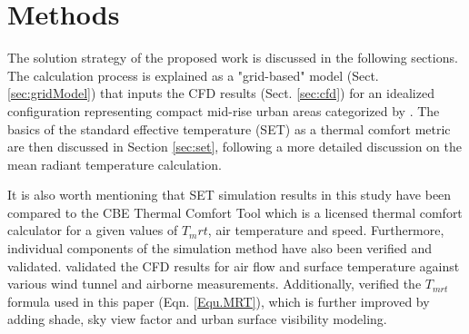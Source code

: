 \documentclass[smallextended]{svjour3}
\begin{document}
%
%
%
%
%
%
%
%
%
%
%
%
%
%
%
%
%   
%
%
%


\section{Methods}
The solution strategy of the proposed work is discussed in the following sections. The calculation process is explained as a "grid-based" model (Sect. \ref{sec:gridModel})  that inputs the CFD results (Sect. \ref{sec:cfd})  for an idealized configuration representing compact mid-rise urban areas categorized by \citet{stewart2012local}. The basics of the standard effective temperature (SET) as a thermal comfort metric are then discussed in Section \ref{sec:set}, following a more detailed discussion on the mean radiant temperature calculation. 

It is also worth mentioning that SET simulation results in this study have been compared to the CBE Thermal Comfort Tool \cite{hoyt2013cbe} which is a licensed thermal comfort calculator for a given values of $T_mrt$, air temperature and speed. Furthermore, individual components of the simulation method have also been verified and validated. \citet{nazarian2014effects, nazarian2015cfd} validated the CFD results for air flow and surface temperature against various wind tunnel and airborne measurements. Additionally,  \cite{huang2014citycomfort+} verified the $T_{mrt}$ formula used in this paper (Eqn. \ref{Equ.MRT}), which is further improved by adding shade, sky view factor and urban surface visibility modeling. 
\end{document}
